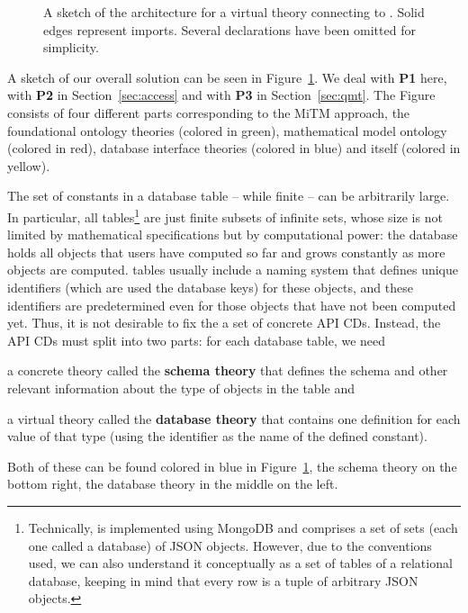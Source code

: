 \begin{figure}[ht]
{
    }
    \endgroup
  \caption[Virtual Theory Architecture]{
    A sketch of the architecture for a virtual theory connecting to \lmfdb. 
    Solid edges represent imports. 
    Several declarations have been omitted for simplicity. 
  }
  \label{fig:vtarch}
\end{figure}
A sketch of our overall solution can be seen in Figure~\ref{fig:vtarch}. 
We deal with \textbf{P1} here, with \textbf{P2} in Section~\ref{sec:access} and with \textbf{P3} in Section~\ref{sec:qmt}. 
The Figure consists of four different parts corresponding to the MiTM approach, the foundational ontology theories (colored in green), mathematical model ontology (colored in red), database interface theories (colored in blue) and \lmfdb itself (colored in yellow). 

The set of constants in a database table -- while finite -- can be arbitrarily large.
In particular, all \lmfdb tables\footnote{Technically, \lmfdb is implemented using MongoDB and comprises a set of sets (each one called a database) of JSON objects. 
However, due to the conventions used, we can also understand it conceptually as a set of tables of a relational database, keeping in mind that every row is a tuple of arbitrary JSON objects.}
are just finite subsets of infinite sets, whose size is not limited by mathematical specifications but by computational power: the database holds all objects that users have computed so far and grows constantly as more objects are computed.
\lmfdb tables usually include a naming system that defines unique identifiers (which are used the database keys) for these objects, and these identifiers are predetermined even for those objects that have not been computed yet.
Thus, it is not desirable to fix the a set of concrete API CDs.
Instead, the API CDs must split into two parts: for each database table, we need
\begin{compactitem}
  \item a concrete theory called the \textbf{schema theory} that defines the schema  and other relevant information about the type of objects in the table and
  \item a virtual theory called the \textbf{database theory} that contains one definition for each value of that type (using the \lmfdb identifier as the name of the defined constant). 
\end{compactitem}
Both of these can be found colored in blue in Figure~\ref{fig:vtarch}, the schema theory on the bottom right, the database theory in the middle on the left. 

